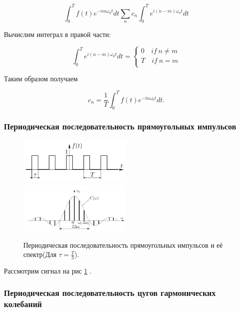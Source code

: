 \documentclass{article}
\begin{document}
\begin{equation*}
    \int_0^T f(t)e^{-im\omega_0t}dt  \sum_n c_n \int_0^T e^{i(n - m)\omega_0t}dt
\end{equation*}

Вычислим интеграл в правой части:

\begin{equation*}
    \int_0^T e^{i(n-m)\omega_0t}dt = 
    \begin{cases}
        0 \quad if \: n \neq m\\
        T \quad if \: n = m\\
    \end{cases}
\end{equation*}

Таким образом получаем

\begin{equation}
    c_n = \frac{1}{T}\int_0^T f(t)e^{-in\omega_0t}dt.
    \label{cn}
\end{equation}

\subsubsection{Периодическая последовательность прямоугольных импульсов}


\begin{figure}[H]
\centering
\includegraphics[width=0.5\textwidth]{sq_imp_example.png}
\includegraphics[width=0.5\textwidth]{sq_imp_spect_example.png}
\caption{Периодическая последовательность прямоугольных импульсов и её спектр(Для $\tau = \frac{T}{3}$).} 
\label{sq_imp_example}
\end{figure}
Рассмотрим сигнал на рис \ref{sq_imp_example}
.


\subsubsection{Периодическая последовательность цугов гармонических колебаний}
\end{document}
